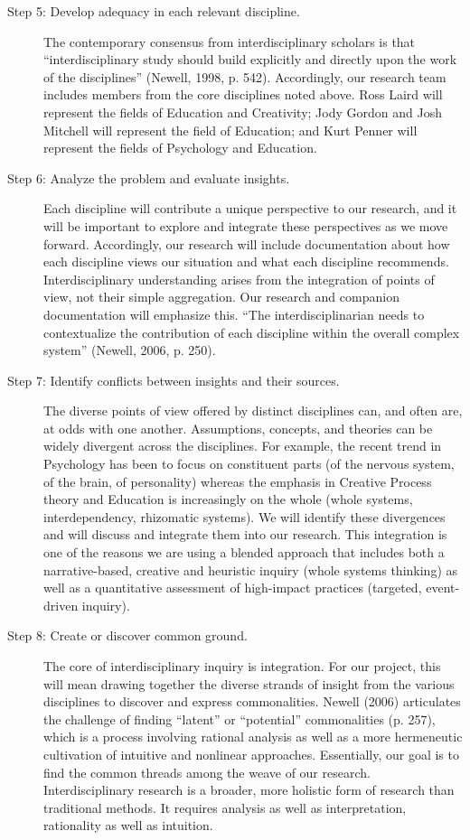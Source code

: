 \documentclass[letterpaper,10pt,headsepline]{scrreprt}
\begin{document}
\begin{description}
\item[Step 5: Develop adequacy in each relevant discipline.] The contemporary
  consensus from interdisciplinary scholars is that ``interdisciplinary study
  should build explicitly and directly upon the work of the disciplines''
  (Newell, 1998, p. 542). Accordingly, our research team includes members from
  the core disciplines noted above. Ross Laird will represent the fields of
  Education and Creativity; Jody Gordon and Josh Mitchell will represent the
  field of Education; and Kurt Penner will represent the fields of Psychology
  and Education.

\item[Step 6: Analyze the problem and evaluate insights.] Each
  discipline will contribute a unique perspective to our research, and it will
  be important to explore and integrate these perspectives as we move forward.
  Accordingly, our research will include documentation about how each
  discipline views our situation and what each discipline recommends.
  Interdisciplinary understanding arises from the integration of points of
  view, not their simple aggregation. Our research and companion documentation
  will emphasize this. ``The interdisciplinarian needs to contextualize the
  contribution of each discipline within the overall complex system'' (Newell,
  2006, p. 250).

\item[Step 7: Identify conﬂicts between insights and their sources.] The
  diverse points of view offered by distinct disciplines can, and often are,
  at odds with one another. Assumptions, concepts, and theories can be widely
  divergent across the disciplines. For example, the recent trend in
  Psychology has been to focus on constituent parts (of the nervous system, of
  the brain, of personality) whereas the emphasis in Creative Process theory
  and Education is increasingly on the whole (whole systems, interdependency,
  rhizomatic systems). We will identify these divergences and will discuss and
  integrate them into our research. This integration is one of the reasons we
  are using a blended approach that includes both a narrative-based, creative
  and heuristic inquiry (whole systems thinking) as well as a quantitative
  assessment of high-impact practices (targeted, event-driven inquiry).



\item[Step 8: Create or discover common ground.] The core of interdisciplinary
  inquiry is integration. For our project, this will mean drawing together the
  diverse strands of insight from the various disciplines to discover and
  express commonalities. Newell (2006) articulates the challenge of finding
  ``latent'' or ``potential'' commonalities (p. 257), which is a process
  involving rational analysis as well as a more hermeneutic cultivation of
  intuitive and nonlinear approaches. Essentially, our goal is to find the
  common threads among the weave of our research. Interdisciplinary research
  is a broader, more holistic form of research than traditional methods. It
  requires analysis as well as interpretation, rationality as well as
  intuition.


\end{description}
\end{document}
